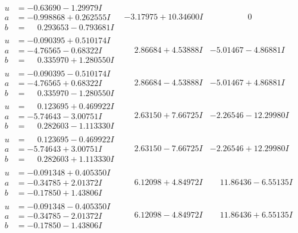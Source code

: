 \documentclass[1p]{elsarticle_modified}
\theoremstyle{definition}
\begin{document}
$$\begin{array}{c|c|c}
\begin{aligned}
u &= -0.63690 - 1.29979 I \\
a &= -0.998868 + 0.262555 I \\
b &= \phantom{-}0.293653 - 0.793681 I\end{aligned}
 & -3.17975 + 10.34600 I & \phantom{-0.000000 } 0 \\ \hline\begin{aligned}
u &= -0.090395 + 0.510174 I \\
a &= -4.76565 - 0.68322 I \\
b &= \phantom{-}0.335970 + 1.280550 I\end{aligned}
 & \phantom{-}2.86684 + 4.53888 I & -5.01467 - 4.86881 I \\ \hline\begin{aligned}
u &= -0.090395 - 0.510174 I \\
a &= -4.76565 + 0.68322 I \\
b &= \phantom{-}0.335970 - 1.280550 I\end{aligned}
 & \phantom{-}2.86684 - 4.53888 I & -5.01467 + 4.86881 I \\ \hline\begin{aligned}
u &= \phantom{-}0.123695 + 0.469922 I \\
a &= -5.74643 - 3.00751 I \\
b &= \phantom{-}0.282603 - 1.113330 I\end{aligned}
 & \phantom{-}2.63150 + 7.66725 I & -2.26546 - 12.29980 I \\ \hline\begin{aligned}
u &= \phantom{-}0.123695 - 0.469922 I \\
a &= -5.74643 + 3.00751 I \\
b &= \phantom{-}0.282603 + 1.113330 I\end{aligned}
 & \phantom{-}2.63150 - 7.66725 I & -2.26546 + 12.29980 I \\ \hline\begin{aligned}
u &= -0.091348 + 0.405350 I \\
a &= -0.34785 + 2.01372 I \\
b &= -0.17850 + 1.43806 I\end{aligned}
 & \phantom{-}6.12098 + 4.84972 I & \phantom{-}11.86436 - 6.55135 I \\ \hline\begin{aligned}
u &= -0.091348 - 0.405350 I \\
a &= -0.34785 - 2.01372 I \\
b &= -0.17850 - 1.43806 I\end{aligned}
 & \phantom{-}6.12098 - 4.84972 I & \phantom{-}11.86436 + 6.55135 I\\

\end{array}$$
\end{document}
